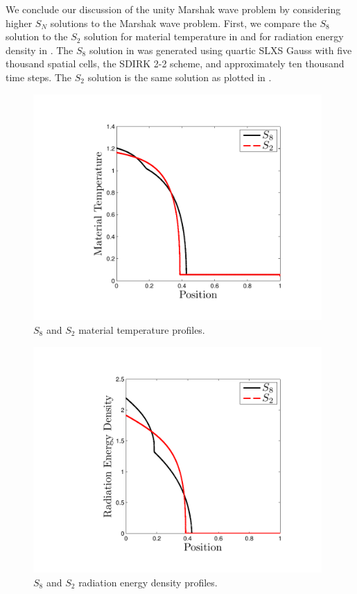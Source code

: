 We conclude our discussion of the unity Marshak wave problem by considering higher $S_N$ solutions to the Marshak wave problem.  
First, we compare the $S_8$ solution to the $S_2$ solution for material temperature in  and for radiation energy density in .  
The $S_8$ solution in  was generated using quartic SLXS Gauss with five thousand spatial cells, the SDIRK 2-2 scheme, and approximately ten thousand time steps.  
The $S_2$ solution is the same solution as plotted in .
\begin{figure}[!htp]
\centering
\includegraphics[width=11cm,trim=1.0in  0.5in 0.2in 0.6in,clip=true]{chapter6_grey_radtran/S8_vs_S2_Material_Temperature.pdf}
\caption{$S_8$ and $S_2$ material temperature profiles.}
\label{fig:s2_vs_s8_temperature}
\end{figure}
%
\begin{figure}[!htp]
\centering
\includegraphics[width=11cm,trim=1.0in  0.3in 0.2in 0.5in,clip=true]{chapter6_grey_radtran/S8_vs_S2_Radiation_Energy_Density.pdf}
\caption{$S_8$ and $S_2$ radiation energy density profiles.}
\label{fig:s2_vs_s8_radiation}
\end{figure}
